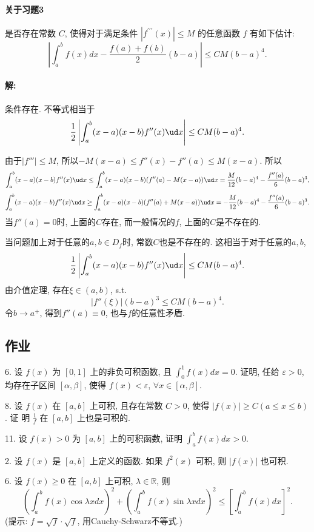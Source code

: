 \paragraph{关于习题3}

是否存在常数 $C$, 使得对于满足条件 $\left|f^{\prime\prime\prime}(x)\right|\leqslant M$
的任意函数 $f$ 有如下估计: 
\[
\left|\int_{a}^{b}f(x)dx-\frac{f(a)+f(b)}{2}(b-a)\right|\leqslant CM(b-a)^{4}.
\]


\paragraph{解:}

条件存在. 不等式相当于
\[
\frac{1}{2}\left|\int_{a}^{b}(x-a)(x-b)f''(x)\ud x\right|\le CM(b-a)^{4}.
\]

由于$\left|f'''\right|\le M$, 所以$-M(x-a)\le f''(x)-f''(a)\le M(x-a)$.
所以
\[
\int_{a}^{b}(x-a)(x-b)f''(x)\ud x\le\int_{a}^{b}(x-a)(x-b)(f''(a)-M(x-a))\ud x=\frac{M}{12}(b-a)^{4}-\frac{f''(a)}{6}(b-a)^{3},
\]
\[
\int_{a}^{b}(x-a)(x-b)f''(x)\ud x\ge\int_{a}^{b}(x-a)(x-b)(f''(a)+M(x-a))\ud x=-\frac{M}{12}(b-a)^{4}-\frac{f''(a)}{6}(b-a)^{3}.
\]
当$f''(a)=0$时, 上面的$C$存在, 而一般情况的$f$, 上面的$C$是不存在的.

当问题加上对于任意的$a,b\in D_{f}$时, 常数$C$也是不存在的. 这相当于对于任意的$a,b$, 
\[
\frac{1}{2}\left|\int_{a}^{b}(x-a)(x-b)f''(x)\ud x\right|\le CM(b-a)^{4}.
\]
由介值定理, 存在$\xi\in(a,b)$, s.t. 
\[
\left|f''(\xi)\right|(b-a)^{3}\le CM(b-a)^{4}.
\]
令$b\to a^{+}$, 得到$f''(a)\equiv0$, 也与$f$的任意性矛盾.

\subsection{作业}

6. 设 $f(x)$ 为 $[0,1]$ 上的非负可积函数, 且 $\int_{0}^{1}f(x)dx=0$. 证明, 任给
$\varepsilon>0$, 均存在子区间 $[\alpha,\beta]$, 使得 $f(x)<\varepsilon$,
$\forall x\in[\alpha,\beta]$.

8. 设 $f(x)$ 在 $[a,b]$ 上可积, 且存在常数 $C>0$, 使得 $|f(x)|\geqslant C(a\leqslant x\leqslant b)$.
证 明 $\frac{1}{f}$ 在 $[a,b]$ 上也是可积的.

11. 设 $f(x)>0$ 为 $[a,b]$ 上的可积函数, 证明 $\int_{a}^{b}f(x)dx>0$.

2. 设 $f(x)$ 是 $[a,b]$ 上定义的函数. 如果 $f^{2}(x)$ 可积, 则 $|f(x)|$ 也可积.

6. 设 $f(x)\geqslant0$ 在 $[a,b]$ 上可积, $\lambda\in\mathbb{R}$, 则
\[
\left(\int_{a}^{b}f(x)\cos\lambda xdx\right)^{2}+\left(\int_{a}^{b}f(x)\sin\lambda xdx\right)^{2}\leqslant\left[\int_{a}^{b}f(x)dx\right]^{2}.
\]
(提示: $f=\sqrt{f}\cdot\sqrt{f}$, 用Cauchy-Schwarz不等式.)

